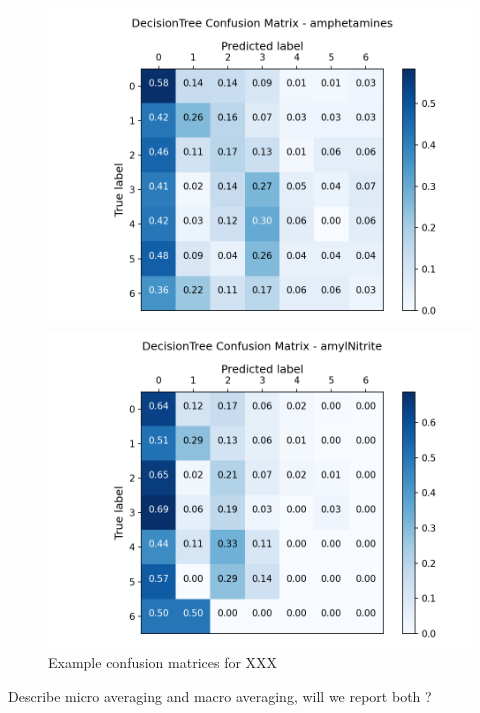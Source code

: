 \documentclass{article}
\begin{document}
\begin{figure}[h!]
	\centering
	\begin{minipage}[b]{0.49\textwidth}
		\includegraphics[width=\textwidth]{plots/m2.png}

	\end{minipage}
	\begin{minipage}[b]{0.49\textwidth}
		\includegraphics[width=\textwidth]{plots/m1.png}

	\end{minipage}

	\caption{Example confusion matrices for {\color{red} XXX }  }
	\label{confusion_matrices}
\end{figure}


{\color{red} Describe micro averaging and macro averaging, will we report both ? }


\clearpage
{}

\end{document}
